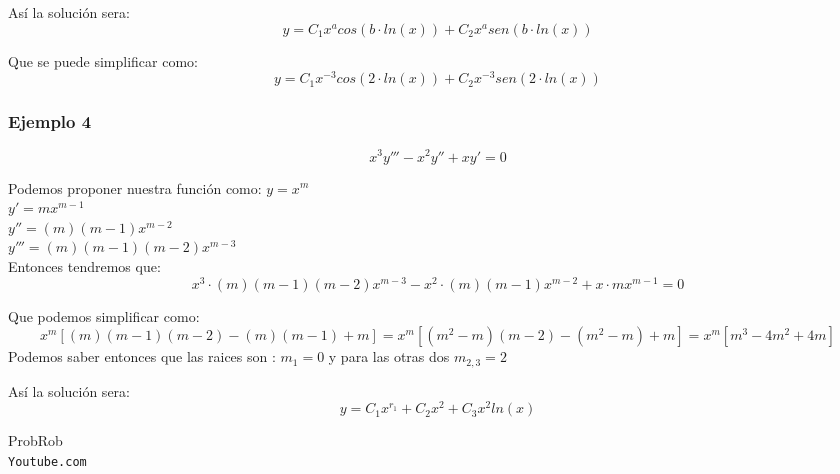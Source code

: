 \documentclass[12pt]{report}                                %
\begin{document}
        Así la solución sera:
        \begin{equation*}
            y = C_1 x^a cos(b \cdot ln(x)) + C_2 x^a sen(b \cdot ln(x))
        \end{equation*}

        Que se puede simplificar como:
        \begin{equation*}
            y = C_1 x^{-3} cos(2 \cdot ln(x)) + C_2 x^{-3} sen(2 \cdot ln(x))
        \end{equation*}

        \clearpage
        \subsubsection{Ejemplo 4}
        \begin{equation*}
            x^3 y''' -x^2y'' + xy' = 0
        \end{equation*}

        Podemos proponer nuestra función como:
        $y = x^m$\\
        $y' = mx^{m-1}$\\
        $y'' = (m)(m-1)x^{m-2}$\\
        $y''' = (m)(m-1)(m-2)x^{m-3}$\\

        Entonces tendremos que:
        \begin{equation*}
            x^3 \cdot (m)(m-1)(m-2)x^{m-3} -x^2 \cdot (m)(m-1)x^{m-2} + x \cdot mx^{m-1} = 0
        \end{equation*}

        Que podemos simplificar como:
        \begin{equation*}
            x^m [(m)(m-1)(m-2) - (m)(m-1) + m ] = x^m[(m^2-m)(m-2) - (m^2-m) + m] 
                                                = x^m[ m^3 - 4m^2 + 4m] 
        \end{equation*}
        Podemos saber entonces que las raices son : $m_1 = 0$ y para las otras dos $m_{2,3} = 2$

        Así la solución sera:
        \begin{equation*}
            y = C_1 x ^{r_1} + C_2 x^2 + C_3 x^2 ln(x)
        \end{equation*}




\clearpage

    \begin{thebibliography}{9}

        ProbRob
        \\\texttt{Youtube.com}


     

\end{thebibliography}
\end{document}
